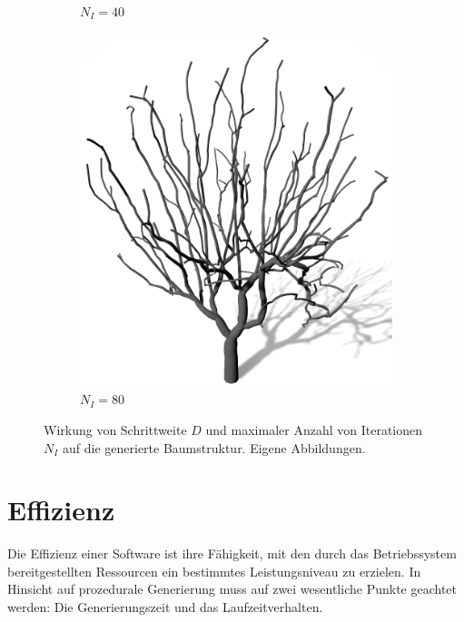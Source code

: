 \begin{figure} [hbtp]
\begin{subfigure}[t]{.45\textwidth}
		\caption{$N_I = 40$}
		\label{subfig:SCA_SI_Iterationen40}
	\end{subfigure}
	\hspace{.05\linewidth}
	\begin{subfigure}[t]{.45\textwidth}
		\centering
		\includegraphics[height=.21\textheight]{images/SCA_SI_Iterationen80.png}
		\caption{$N_I = 80$}
		\label{subfig:SCA_SI_Iterationen80}
	\end{subfigure}
	\caption{Wirkung von Schrittweite $D$ und maximaler Anzahl von Iterationen $N_I$ auf die generierte Baumstruktur. Eigene Abbildungen.}
	\label{fig:SCA_SI}
\end{figure}

\section{Effizienz}

Die Effizienz einer Software ist ihre Fähigkeit, mit den durch das Betriebssystem bereitgestellten Ressourcen ein bestimmtes Leistungsniveau zu erzielen. \cite[S.259]{Softwaremanagement:98} In Hinsicht auf prozedurale Generierung muss auf zwei wesentliche Punkte geachtet werden: Die Generierungszeit und das Laufzeitverhalten.

